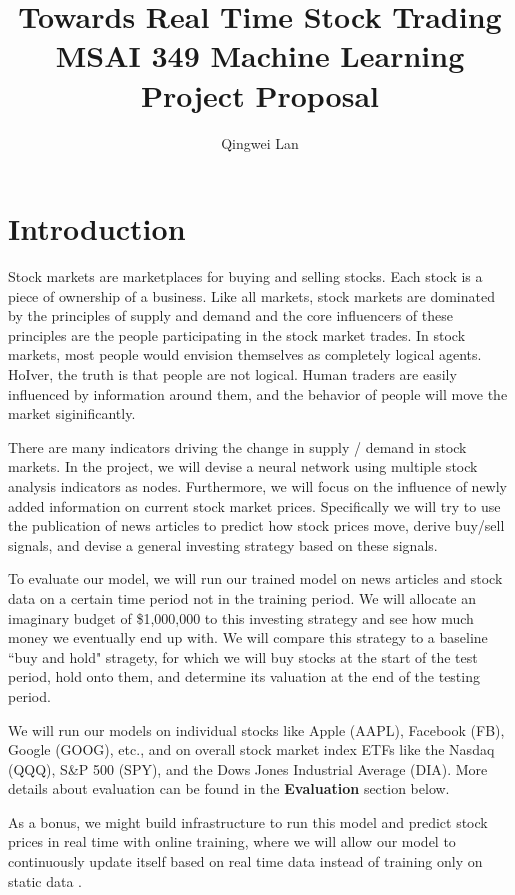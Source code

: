 \documentclass[10pt]{article}
\title{
    Towards Real Time Stock Trading \\[.5cm]
    \normalsize MSAI 349 Machine Learning Project Proposal
}
\author{Qingwei Lan}
\begin{document}
\maketitle


\section{Introduction}

Stock markets are marketplaces for buying and selling stocks. Each stock is a piece of ownership of a business. Like all markets, stock markets are dominated by the principles of supply and demand and the core influencers of these principles are the people participating in the stock market trades. In stock markets, most people would envision themselves as completely logical agents. HoIver, the truth is that people are not logical. Human traders are easily influenced by information around them, and the behavior of people will move the market siginificantly.

There are many indicators driving the change in supply / demand in stock markets. In the project, we will devise a neural network using multiple stock analysis indicators as nodes. Furthermore, we will focus on the influence of newly added information on current stock market prices. Specifically we will try to use the publication of news articles to predict how stock prices move, derive buy/sell signals, and devise a general investing strategy based on these signals.

To evaluate our model, we will run our trained model on news articles and stock data on a certain time period not in the training period. We will allocate an imaginary budget of \$1,000,000 to this investing strategy and see how much money we eventually end up with. We will compare this strategy to a baseline ``buy and hold" stragety, for which we will buy stocks at the start of the test period, hold onto them, and determine its valuation at the end of the testing period.

We will run our models on individual stocks like Apple (AAPL), Facebook (FB), Google (GOOG), etc., and on overall stock market index ETFs like the Nasdaq (QQQ), S\&P 500 (SPY), and the Dows Jones Industrial Average (DIA). More details about evaluation can be found in the \textbf{Evaluation} section below.

As a bonus, we might build infrastructure to run this model and predict stock prices in real time with online training, where we will allow our model to continuously update itself based on real time data instead of training only on static data \cite{parisi:2019}.
\end{document}
